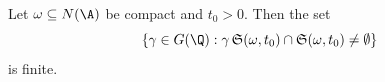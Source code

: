 Let $\omega\subseteq N(\A)$ be compact and $t_0>0$. Then the set
\[
  \{\gamma\in G(\Q):\gamma\,\mathfrak S(\omega,t_0)\cap\mathfrak S(\omega,t_0)\neq\emptyset\}
\]
is finite.
